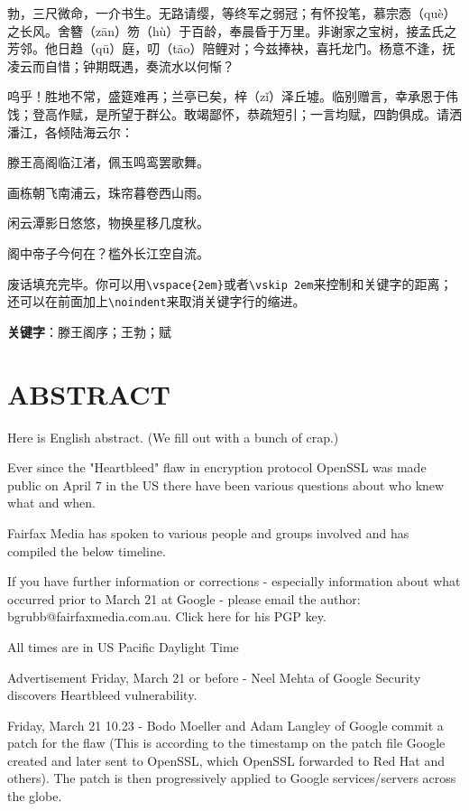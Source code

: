 勃，三尺微命，一介书生。无路请缨，等终军之弱冠；有怀投笔，慕宗悫（què）之长风。舍簪（zān）笏（hù）于百龄，奉晨昏于万里。非谢家之宝树，接孟氏之芳邻。他日趋（qū）庭，叨（tāo）陪鲤对；今兹捧袂，喜托龙门。杨意不逢，抚凌云而自惜；钟期既遇，奏流水以何惭？

呜乎！胜地不常，盛筵难再；兰亭已矣，梓（zǐ）泽丘墟。临别赠言，幸承恩于伟饯；登高作赋，是所望于群公。敢竭鄙怀，恭疏短引；一言均赋，四韵俱成。请洒潘江，各倾陆海云尔：

\begin{center}
滕王高阁临江渚，佩玉鸣鸾罢歌舞。

画栋朝飞南浦云，珠帘暮卷西山雨。

闲云潭影日悠悠，物换星移几度秋。

阁中帝子今何在？槛外长江空自流。
\end{center}

废话填充完毕。你可以用\verb|\vspace{2em}|或者\verb|\vskip 2em|来控制和关键字的距离；还可以在前面加上\verb|\noindent|来取消关键字行的缩进。

\vspace{2em}
\noindent\textbf{关键字}：滕王阁序；王勃；赋


\chapter{ABSTRACT}
Here is English abstract. (We fill out with a bunch of crap.)

Ever since the "Heartbleed" flaw in encryption protocol OpenSSL was made public on April 7 in the US there have been various questions about who knew what and when.

Fairfax Media has spoken to various people and groups involved and has compiled the below timeline.

If you have further information or corrections - especially information about what occurred prior to March 21 at Google - please email the author: bgrubb@fairfaxmedia.com.au. Click here for his PGP key.

All times are in US Pacific Daylight Time

Advertisement
Friday, March 21 or before - Neel Mehta of Google Security discovers Heartbleed vulnerability.

Friday, March 21 10.23 -  Bodo Moeller and Adam Langley of Google commit a patch for the flaw (This is according to the timestamp on the patch file Google created and later sent to OpenSSL, which OpenSSL forwarded to Red Hat and others). The patch is then progressively applied to Google services/servers across the globe.

